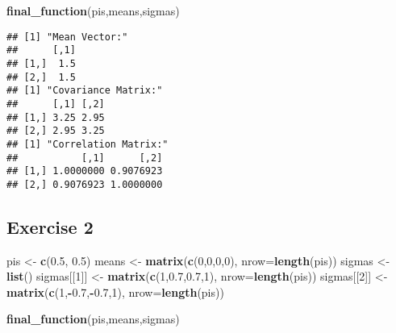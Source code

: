 \documentclass[]{article}
\newenvironment{Shaded}{\begin{snugshade}}{\end{snugshade}}
\newcommand{\DataTypeTok}[1]{\textcolor[rgb]{0.13,0.29,0.53}{#1}}
\newcommand{\DecValTok}[1]{\textcolor[rgb]{0.00,0.00,0.81}{#1}}
\newcommand{\FloatTok}[1]{\textcolor[rgb]{0.00,0.00,0.81}{#1}}
\newcommand{\KeywordTok}[1]{\textcolor[rgb]{0.13,0.29,0.53}{\textbf{#1}}}
\newcommand{\NormalTok}[1]{#1}
\newcommand{\OperatorTok}[1]{\textcolor[rgb]{0.81,0.36,0.00}{\textbf{#1}}}
\newcommand{\StringTok}[1]{\textcolor[rgb]{0.31,0.60,0.02}{#1}}
\begin{document}
\begin{Shaded}
\begin{Highlighting}[]
\KeywordTok{final_function}\NormalTok{(pis,means,sigmas)}
\end{Highlighting}
\end{Shaded}

\begin{verbatim}
## [1] "Mean Vector:"
##      [,1]
## [1,]  1.5
## [2,]  1.5
## [1] "Covariance Matrix:"
##      [,1] [,2]
## [1,] 3.25 2.95
## [2,] 2.95 3.25
## [1] "Correlation Matrix:"
##           [,1]      [,2]
## [1,] 1.0000000 0.9076923
## [2,] 0.9076923 1.0000000
\end{verbatim}

\hypertarget{exercise-2}{%
\subsection{Exercise 2}\label{exercise-2}}

\begin{Shaded}
\begin{Highlighting}[]
\NormalTok{pis <-}\StringTok{ }\KeywordTok{c}\NormalTok{(}\FloatTok{0.5}\NormalTok{, }\FloatTok{0.5}\NormalTok{)}
\NormalTok{means <-}\StringTok{ }\KeywordTok{matrix}\NormalTok{(}\KeywordTok{c}\NormalTok{(}\DecValTok{0}\NormalTok{,}\DecValTok{0}\NormalTok{,}\DecValTok{0}\NormalTok{,}\DecValTok{0}\NormalTok{), }\DataTypeTok{nrow=}\KeywordTok{length}\NormalTok{(pis))}
\NormalTok{sigmas <-}\StringTok{ }\KeywordTok{list}\NormalTok{()}
\NormalTok{sigmas[[}\DecValTok{1}\NormalTok{]] <-}\StringTok{ }\KeywordTok{matrix}\NormalTok{(}\KeywordTok{c}\NormalTok{(}\DecValTok{1}\NormalTok{,}\FloatTok{0.7}\NormalTok{,}\FloatTok{0.7}\NormalTok{,}\DecValTok{1}\NormalTok{), }\DataTypeTok{nrow=}\KeywordTok{length}\NormalTok{(pis))}
\NormalTok{sigmas[[}\DecValTok{2}\NormalTok{]] <-}\StringTok{ }\KeywordTok{matrix}\NormalTok{(}\KeywordTok{c}\NormalTok{(}\DecValTok{1}\NormalTok{,}\OperatorTok{-}\FloatTok{0.7}\NormalTok{,}\OperatorTok{-}\FloatTok{0.7}\NormalTok{,}\DecValTok{1}\NormalTok{), }\DataTypeTok{nrow=}\KeywordTok{length}\NormalTok{(pis))}
\end{Highlighting}
\end{Shaded}

\begin{Shaded}
\begin{Highlighting}[]
\KeywordTok{final_function}\NormalTok{(pis,means,sigmas)}
\end{Highlighting}
\end{Shaded}
\end{document}
